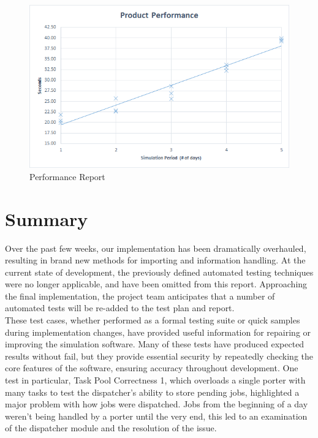 \documentclass[paper=letter, fontsize=10pt]{scrartcl}
\numberwithin{equation}{section}		%
\numberwithin{figure}{section}			%
\numberwithin{table}{section}				%
\begin{document}
\begin{enumerate}[(i)]
\begin{enumerate}[(i)]
\end{enumerate}

	\begin{figure}[!htbp]
		\begin{center}
			\includegraphics[width=1\columnwidth, height=0.4\textheight, keepaspectratio] {performancereport.png}
			\caption{Performance Report}
		\end{center}
	\end{figure}

\section{Summary}
Over the past few weeks, our implementation has been dramatically overhauled, resulting in brand new methods for importing and information handling. At the current state of development, the previously defined automated testing techniques were no longer applicable, and have been omitted from this report. Approaching the final implementation, the project team anticipates that a number of automated tests will be re-added to the test plan and report. 
\\
These test cases, whether performed as a formal testing suite or quick samples during implementation changes, have provided useful information for repairing or improving the simulation software. Many of these tests have produced expected results without fail, but they provide essential security by repeatedly checking the core features of the software, ensuring accuracy throughout development.   One test in particular, Task Pool Correctness 1, which overloads a single porter with many tasks to test the dispatcher's ability to store pending jobs, highlighted a major problem with how jobs were dispatched. Jobs from the beginning of a day weren't being handled by a porter until the very end, this led to an examination of the dispatcher module and the resolution of the issue. 

\end{enumerate}
\end{document}
